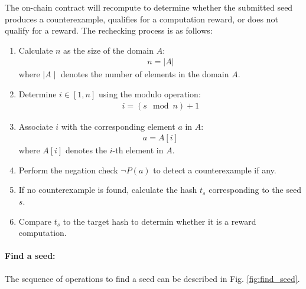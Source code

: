 \documentclass[runningheads]{llncs}
\begin{document}
The on-chain contract will recompute to determine whether the submitted seed produces a counterexample, qualifies for a computation reward, or does not qualify for a reward. The rechecking process is as follows:
\begin{enumerate}
\item Calculate $n$ as the size of the domain $A$: 
\begin{align}
n = |A|
\end{align}
where $\mid A \mid$ denotes the number of elements in the domain $A$.
\item Determine $i \in [1, n]$ using the modulo operation:
\begin{align}
i = (s \mod n) + 1
\end{align}
\item Associate \( i \) with the corresponding element $a$ in $A$:
\begin{align}
a=A[i]
\end{align}
where $A[i]$ denotes the $i$-th element in $A$.
\item Perform the negation check $\neg P(a)$ to detect a counterexample if any.

\item If no counterexample is found, calculate the hash \( t_s \) corresponding to the seed \( s \).
\item Compare \( t_s \) to the target hash to determin whether it is a reward computation.
\end{enumerate}
\paragraph{Find a seed:}
The sequence of operations to find a seed can be described in Fig. \ref{fig:find_seed}.
\end{document}
